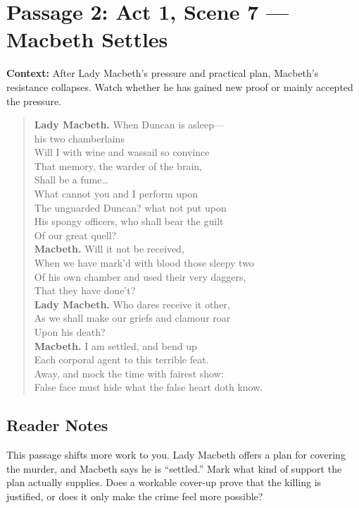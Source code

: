 \documentclass[12pt]{article}
\newenvironment{playpassage}{\begin{quote}\small\setlength{\parskip}{0.12em}\setlength{\parindent}{0pt}}{\end{quote}}
\newcommand{\speaker}[1]{\textbf{#1.}}
\begin{document}
\newpage

\section*{Passage 2: Act 1, Scene 7 --- Macbeth Settles}

\textbf{Context:} After Lady Macbeth's pressure and practical plan, Macbeth's resistance collapses. Watch whether he has gained new proof or mainly accepted the pressure.

\begin{playpassage}
\speaker{Lady Macbeth} When Duncan is asleep---\\
his two chamberlains\\
Will I with wine and wassail so convince\\
That memory, the warder of the brain,\\
Shall be a fume\ldots\\
What cannot you and I perform upon\\
The unguarded Duncan? what not put upon\\
His spongy officers, who shall bear the guilt\\
Of our great quell?\\
\speaker{Macbeth} Will it not be received,\\
When we have mark'd with blood those sleepy two\\
Of his own chamber and used their very daggers,\\
That they have done't?\\
\speaker{Lady Macbeth} Who dares receive it other,\\
As we shall make our griefs and clamour roar\\
Upon his death?\\
\speaker{Macbeth} I am settled, and bend up\\
Each corporal agent to this terrible feat.\\
Away, and mock the time with fairest show:\\
False face must hide what the false heart doth know.
\end{playpassage}

\subsection*{Reader Notes}

This passage shifts more work to you. Lady Macbeth offers a plan for covering the murder, and Macbeth says he is ``settled.'' Mark what kind of support the plan actually supplies. Does a workable cover-up prove that the killing is justified, or does it only make the crime feel more possible?
\end{document}
